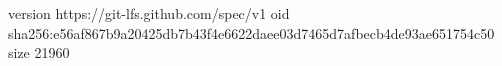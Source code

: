 version https://git-lfs.github.com/spec/v1
oid sha256:e56af867b9a20425db7b43f4e6622daee03d7465d7afbecb4de93ae651754c50
size 21960
